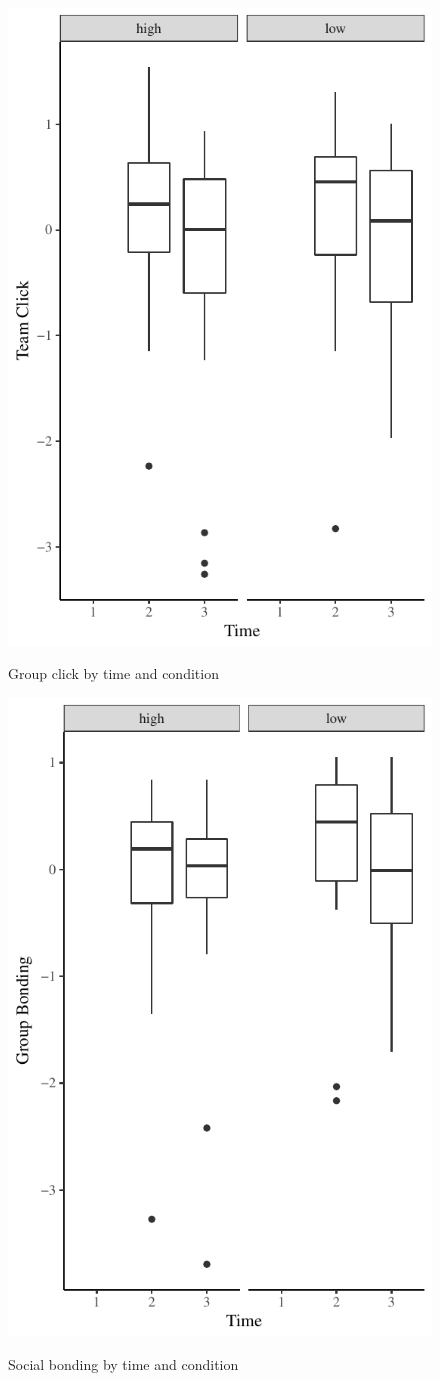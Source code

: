\begin{figure}
  \centering
  \includegraphics[width=0.5\linewidth,keepaspectratio] {images/prePostClickPLot}
  \label{fig:prePostClickPLot}
  \caption{Group click by time and condition}
\end{figure}

\begin{figure}
  \centering
  \includegraphics[width=0.5\linewidth,keepaspectratio] {images/prePostBondingPlot}
    \label{fig:prePostBondingPlot}
  \caption{Social bonding by time and condition}
\end{figure}







